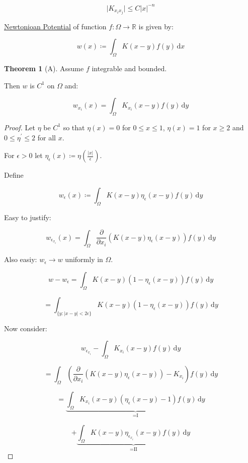 \documentclass{article}
\theoremstyle{definition}
\newtheorem{theorem}{Theorem}
\begin{document}
\[
    \vert K_{x_i x_j} \vert \leq C \vert x \vert ^{-n}
\]

\underline{Newtonioan Potential} of function \(f: \Omega \to \mathbb{R}\) is given by:

\[
    w(x) \coloneqq \int_{\Omega} K(x-y)f(y) \,\mathrm{d}x 
\]

\begin{theorem}
    [A] Assume \(f\) integrable and bounded.

    Then \(w\) is \(C^1\) on \(\Omega\) and:

    \[
        w_{x_i} (x) = \int_{\Omega} K_{x_i} (x-y) f(y) \,\mathrm{d}y 
    \]
\end{theorem}

\begin{proof}
    Let \(\eta\) be \(C^1\) so that \(\eta(x) = 0\) for \(0 \leq x \leq 1\), \(\eta(x) = 1\) for \(x\geq 2\) and \(0 \leq \eta ^{\prime}  \leq 2\) for all \(x\).

    For \(\epsilon > 0\) let \(\eta _\epsilon (x) \coloneqq \eta \left( \frac{\vert x \vert }{\epsilon} \right)\).
    
    Define

    \[
        w_{\epsilon} (x) \coloneqq \int_{\Omega} K(x-y) \eta_{\epsilon} (x-y) f(y) \,\mathrm{d}y 
    \]

    Easy to justify:

    \[
        w_{\epsilon_{x_i}} (x) = \int_{\Omega} \frac{\partial}{\partial x_i} \left( K(x-y) \eta_{\epsilon} (x-y) \right) f(y) \,\mathrm{d}y 
    \]

    Also easiy: \(w_{\epsilon} \to w\) uniformly in \(\Omega\).

    \[
        w - w_{\epsilon} = \int_{\Omega} K(x-y) (1 - \eta_{\epsilon}(x-y))f(y) \,\mathrm{d}y 
    \]

    \[
        = \int_{\{ y: \vert x - y \vert < 2 \epsilon \} } K(x-y)(1-\eta_{\epsilon } (x-y) )f(y) \,\mathrm{d}y 
    \]

    Now consider:

    \[
        w_{\epsilon_{x_i}} - \int_{\Omega} K_{x_i} (x-y) f(y) \,\mathrm{d}y 
    \]

    \[
        = \int_{\Omega} \left( \frac{\partial}{\partial x_i} \left( K(x-y) \eta_{\epsilon} (x-y) \right) - K_{x_i} \right) f(y) \,\mathrm{d}y 
    \]

    \[
        = \underbrace{\int_{\Omega} K_{x_i} (x-y) (\eta_{\epsilon}(x-y) - 1)f(y) \,\mathrm{d}y}_{=\text{I}}
    \]

    \[
        + \underbrace{ \int_{\Omega} K(x-y) \eta_{\epsilon_{x_i} } (x-y) f(y) \,\mathrm{d}y }_{=\text{II}}
    \]


\end{proof}
\end{document}
